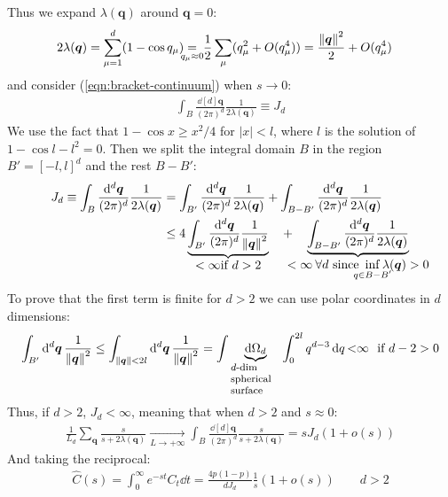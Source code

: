 \documentclass[../../main.tex]{subfiles}
\begin{document}
Thus we expand $\lambda(\bm{q})$ around $\bm{q} = 0$:
\begin{align}\label{eqn:lambda-expansion}
    2 \lambda(\bm{q}) &= \sum_{\mu=1}^d (1- \cos q_\mu) \underset{\mathclap{q_\mu \approx 0}}{=}\> \frac{1}{2} \sum_{\mu} (q_\mu^2 + O(q_\mu^4)) = \frac{\norm{\bm{q}}^2}{2} + O(q_\mu^4)
\end{align} %
and consider (\ref{eqn:bracket-continuum}) when $s \to 0$:
\begin{align*}
    \int_B \frac{\dd[d]{\bm{q}}}{(2\pi)^d} \frac{1}{2 \lambda(\bm{q})} \equiv J_d
\end{align*}
We use the fact that $1 - \cos x \geq x^2/4$ for $|x| < l$, where $l$ is the solution of $1-\cos l - l^2 = 0$. Then we split the integral domain $B$ in the region $B' = [-l,l]^d$ and the rest $B-B'$:
\begin{align*}
    J_d \equiv \int_B \frac{\dd[d]{\bm{q}}}{(2\pi)^d} \frac{1}{2 \lambda(\bm{q})} &= \int_{B'} \frac{\dd[d]{\bm{q}}}{(2 \pi)^d} \frac{1}{2 \lambda(\bm{q})} + \int_{B - B'} \frac{\dd[d]{\bm{q}}}{(2\pi)^d} \frac{1}{2 \lambda(\bm{q})} \\
    &\leq 4 \underbrace{\int_{B'} \frac{\dd[d]{\bm{q}}}{(2\pi)^d} \frac{1}{\norm{\bm{q}}^2}}_{\displaystyle < \infty \text{if $d > 2$}}\quad  +  \quad\underbrace{\int_{B - B'} \frac{\dd[d]{\bm{q}}}{(2\pi)^d}   \frac{1}{2 \lambda(\bm{q})} }_{\mathclap{\displaystyle  < \infty \> \forall d \text{ since } \inf_{\mathclap{q \in B - B'}} \lambda(\bm{q}) > 0}}
\end{align*}
To prove that the first term is finite for $d > 2$ we can use polar coordinates in $d$ dimensions:
\begin{align*}
    \int_{B'} \dd[d]{\bm{q}} \frac{1}{\norm{\bm{q}}^2} \leq \int_{\norm{\bm{q}} < 2l}  \dd[d]{\bm{q}} \frac{1}{\norm{\bm{q}}^2} = \int \underbrace{\dd{\Omega_d} }_{\parbox[c]{4em}{\footnotesize$d$-dim spherical surface}} \int_0^{2l} q^{d-3} \dd{q} {<}  \infty \text{\ \ if $d-2>0$}
\end{align*}
Thus, if $d > 2$, $J_d < \infty$, meaning that when $d > 2$ and $s \approx 0$:
\begin{align*}
    \frac{1}{L_d} \sum_{\bm{q}} \frac{s}{s + 2 \lambda(\bm{q})}  \xrightarrow[L \to +\infty]{} \int_B \frac{\dd[d]{\bm{q}}}{(2\pi)^d} \frac{s}{s + 2 \lambda(\bm{q})} = s J_d (1 + o(s))  
\end{align*}
And taking the reciprocal:
\begin{align}\label{eqn:C-transform}
    \hat{C}(s) = \int_0^\infty e^{-st} C_t \dd{t} = \frac{4p(1-p)}{d J_d} \frac{1}{s} (1 + o(s)) \qquad d > 2
\end{align}
\end{document}
